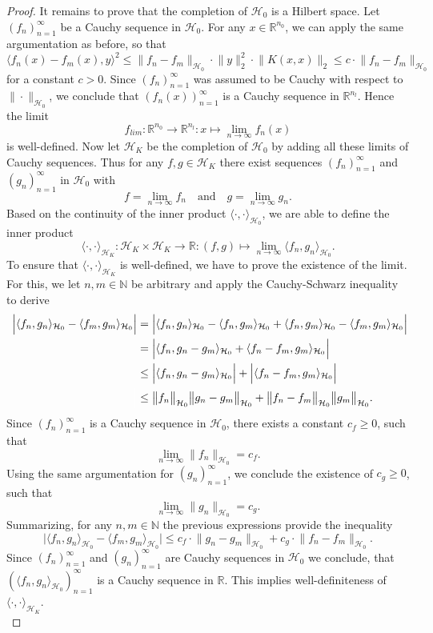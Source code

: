 \documentclass[11pt, a4paper]{article}
\newcommand{\N}{\mathbb{N}}
\newcommand{\R}{\mathbb{R}}
\renewcommand{\H}{\mathcal{H}}
\begin{document}
\begin{proof}
It remains to prove that the completion of $\H_0$ is a Hilbert space. Let $(f_n)_{n=1}^{\infty}$ be a Cauchy sequence in $\H_0$. For any $x \in \R^{n_0}$, we can apply the same argumentation as before, so that
\[ \big \langle f_n(x) -f_m(x), y \big \rangle^2 \leq \big \| f_n - f_m \big \|_{\H_0} \cdot \big \| y \big \|_2^2 \cdot \big \| K(x,x) \big \|_2 \leq c \cdot \big \| f_n - f_m \big \|_{\H_0} \]
for a constant $c > 0$. Since $(f_n)_{n=1}^{\infty}$ was assumed to be Cauchy with respect to $\| \cdot \|_{\H_0}$, we conclude that $(f_n(x))_{n=1}^{\infty}$ is a Cauchy sequence in $\R^{n_l}$. Hence the limit
\[ f_\textit{lim} : \R^{n_0} \to \R^{n_l} : x \mapsto \lim_{n \to \infty} f_n(x) \]
is well-defined. Now let $\H_K$ be the completion of $\H_0$ by adding all these limits of Cauchy sequences. Thus for any $f,g \in \H_K$ there exist sequences $(f_n)_{n=1}^{\infty}$ and $(g_n)_{n=1}^{\infty}$ in $\H_0$ with 
\[ f = \lim_{n \to \infty} f_n \quad \text{and} \quad g = \lim_{n \to \infty} g_n. \]
Based on the continuity of the inner product $\langle \cdot, \cdot \rangle_{\H_0}$, we are able to define the inner product
\[ \langle \cdot, \cdot \rangle_{\H_K} : \H_K \times \H_K \to \R : (f,g) \mapsto \lim_{n \to \infty} \langle f_n, g_n \rangle_{\H_0}. \]
To ensure that $\langle \cdot, \cdot \rangle_{\H_K}$ is well-defined, we have to prove the existence of the limit. For this, we let $n, m \in \N$ be arbitrary and apply the Cauchy-Schwarz inequality to derive 
\[ \begin{split}
\Big | \langle f_n, g_n \rangle_{\H_0} - \langle f_m, g_m \rangle_{\H_0} \Big | 
&= \Big | \langle f_n, g_n \rangle_{\H_0} - \langle f_n, g_m \rangle_{\H_0} + \langle f_n, g_m \rangle_{\H_0} - \langle f_m, g_m \rangle_{\H_0} \Big | \\\
&= \Big | \langle f_n, g_n - g_m \rangle_{\H_0} + \langle f_n - f_m, g_m \rangle_{\H_0} \Big | \\\
&\leq \Big | \langle f_n, g_n - g_m \rangle_{\H_0} \Big | + \Big | \langle f_n - f_m, g_m \rangle_{\H_0} \Big | \\\
\textcolor{white}{\Big |} &\leq \big \| f_n \big \|_{\H_0} \big \| g_n - g_m \big \|_{\H_0} + \big \| f_n - f_m \big \|_{\H_0} \big \| g_m \big \|_{\H_0}.
\end{split} \]
Since $(f_n)_{n=1}^\infty$ is a Cauchy sequence in $\H_0$, there exists a constant $c_f \geq 0$, such that
\[ \lim_{n \to \infty} \| f_n \big \|_{\H_0} = c_f. \]
Using the same argumentation for $(g_n)_{n=1}^\infty$, we conclude the existence of $c_g \geq 0$, such that 
\[ \lim_{n \to \infty} \| g_n \big \|_{\H_0} = c_g. \] 
Summarizing, for any $n,m \in \N$ the previous expressions provide the inequality
\[ \Big | \langle f_n, g_n \rangle_{\H_0} - \langle f_m, g_m \rangle_{\H_0} \Big | \leq c_f \cdot  \big \| g_n - g_m \big \|_{\H_0} + c_g \cdot \big \| f_n - f_m \big \|_{\H_0}. \]
Since $(f_n)_{n=1}^\infty$ and $(g_n)_{n=1}^\infty$ are Cauchy sequences in $\H_0$ we conclude, that $(\langle f_n, g_n \rangle_{\H_0})_{n=1}^\infty$ is a Cauchy sequence in $\R$. This implies well-definiteness of $\langle \cdot, \cdot \rangle_{\H_K}$. \\


\end{proof}
\end{document}
